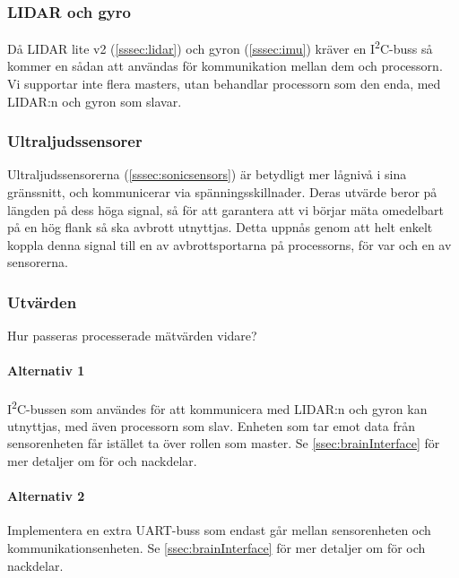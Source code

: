 \documentclass[a4paper,11pt]{article}
\begin{document}
\subsubsection{LIDAR och gyro}
Då LIDAR lite v2 (\ref{sssec:lidar}) och gyron (\ref{sssec:imu}) kräver en I\textsuperscript{2}C-buss så kommer en sådan att användas för kommunikation mellan dem och processorn. Vi supportar inte flera masters, utan behandlar processorn som den enda, med LIDAR:n och gyron som slavar.

\subsubsection{Ultraljudssensorer}
Ultraljudssensorerna (\ref{sssec:sonicsensors}) är betydligt mer lågnivå i sina gränssnitt, och kommunicerar via spänningsskillnader. Deras utvärde beror på längden på dess höga signal, så för att garantera att vi börjar mäta omedelbart på en hög flank så ska avbrott utnyttjas. Detta uppnås genom att helt enkelt koppla denna signal till en av avbrottsportarna på processorns, för var och en av sensorerna.

\subsubsection{Utvärden}
Hur passeras processerade mätvärden vidare?

\paragraph{Alternativ 1}
I\textsuperscript{2}C-bussen som användes för att kommunicera med LIDAR:n och gyron kan utnyttjas, med även processorn som slav. Enheten som tar emot data från sensorenheten får istället ta över rollen som master. Se \ref{ssec:brainInterface} för mer detaljer om för och nackdelar.

\paragraph{Alternativ 2}
Implementera en extra UART-buss som endast går mellan sensorenheten och kommunikationsenheten. Se \ref{ssec:brainInterface} för mer detaljer om för och nackdelar.

\newpage
\end{document}
